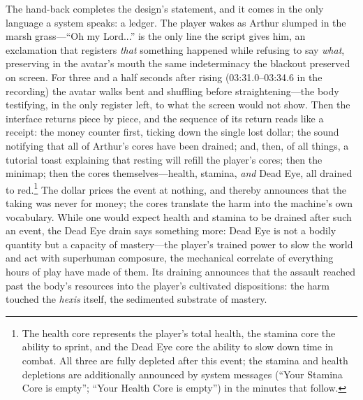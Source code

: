 The hand-back completes the design's statement, and it comes in the only language a system speaks: a ledger. The player wakes as Arthur slumped in the marsh grass---``Oh my Lord...'' is the only line the script gives him, an exclamation that registers \textit{that} something happened while refusing to say \textit{what}, preserving in the avatar's mouth the same indeterminacy the blackout preserved on screen. For three and a half seconds after rising (03:31.0--03:34.6 in the recording) the avatar walks bent and shuffling before straightening---the body testifying, in the only register left, to what the screen would not show. Then the interface returns piece by piece, and the sequence of its return reads like a receipt: the money counter first, ticking down the single lost dollar; the sound notifying that all of Arthur's cores have been drained; and, then, of all things, a tutorial toast explaining that resting will refill the player's cores; then the minimap; then the cores themselves---health, stamina, \textit{and} Dead Eye, all drained to red.\footnote{The health core represents the player's total health, the stamina core the ability to sprint, and the Dead Eye core the ability to slow down time in combat. All three are fully depleted after this event; the stamina and health depletions are additionally announced by system messages (``Your Stamina Core is empty''; ``Your Health Core is empty'') in the minutes that follow.} The dollar prices the event at nothing, and thereby announces that the taking was never for money; the cores translate the harm into the machine's own vocabulary. While one would expect health and stamina to be drained after such an event, the Dead Eye drain says something more: Dead Eye is not a bodily quantity but a capacity of mastery---the player's trained power to slow the world and act with superhuman composure, the mechanical correlate of everything hours of play have made of them. Its draining announces that the assault reached past the body's resources into the player's cultivated dispositions: the harm touched the \textit{hexis} itself, the sedimented substrate of mastery. 

